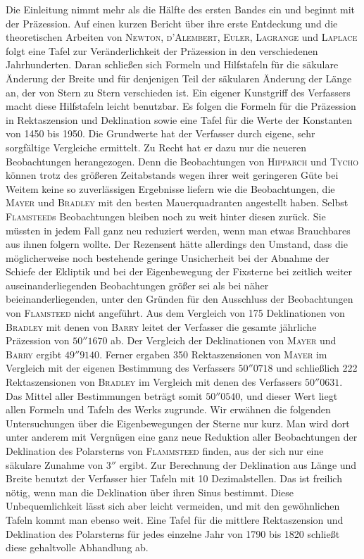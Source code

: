 Die Einleitung nimmt mehr als die Hälfte des ersten Bandes ein und beginnt mit der Präzession. Auf einen kurzen Bericht über ihre erste Entdeckung und die theoretischen Arbeiten von \textsc{Newton}, \textsc{d’Alembert}, \textsc{Euler}, \textsc{Lagrange} und \textsc{Laplace} folgt eine Tafel zur Veränderlichkeit der Präzession in den verschiedenen Jahrhunderten. Daran schließen sich Formeln und Hilfstafeln für die säkulare Änderung der Breite und für denjenigen Teil der säkularen Änderung der Länge an, der von Stern zu Stern verschieden ist. Ein eigener Kunstgriff des Verfassers macht diese Hilfstafeln leicht benutzbar. Es folgen die Formeln für die Präzession in Rektaszension und Deklination sowie eine Tafel für die Werte der Konstanten von 1450 bis 1950. Die Grundwerte hat der Verfasser durch eigene, sehr sorgfältige Vergleiche ermittelt. Zu Recht hat er dazu nur die neueren Beobachtungen herangezogen. Denn die Beobachtungen von \textsc{Hipparch} und \textsc{Tycho} können trotz des größeren Zeitabstands wegen ihrer weit geringeren Güte bei Weitem keine so zuverlässigen Ergebnisse liefern wie die Beobachtungen, die \textsc{Mayer} und \textsc{Bradley} mit den besten Mauerquadranten angestellt haben. Selbst \textsc{Flamsteed}s Beobachtungen bleiben noch zu weit hinter diesen zurück. Sie müssten in jedem Fall ganz neu reduziert werden, wenn man etwas Brauchbares aus ihnen folgern wollte. Der Rezensent hätte allerdings den Umstand, dass die möglicherweise noch bestehende geringe Unsicherheit bei der Abnahme der Schiefe der Ekliptik und bei der Eigenbewegung der Fixsterne bei zeitlich weiter auseinanderliegenden Beobachtungen größer sei als bei näher beieinanderliegenden, unter den Gründen für den Ausschluss der Beobachtungen von \textsc{Flamsteed} nicht angeführt. Aus dem Vergleich von 175 Deklinationen von \textsc{Bradley} mit denen von \textsc{Barry} leitet der Verfasser die gesamte jährliche Präzession von $50''1670$ ab. Der Vergleich der Deklinationen von \textsc{Mayer} und \textsc{Barry} ergibt $49''9140$. Ferner ergaben 350 Rektaszensionen von \textsc{Mayer} im Vergleich mit der eigenen Bestimmung des Verfassers $50''0718$ und schließlich 222 Rektaszensionen von \textsc{Bradley} im Vergleich mit denen des Verfassers $50''0631$. Das Mittel aller Bestimmungen beträgt somit $50''0540$, und dieser Wert liegt allen Formeln und Tafeln des Werks zugrunde. Wir erwähnen die folgenden Untersuchungen über die Eigenbewegungen der Sterne nur kurz. Man wird dort unter anderem mit Vergnügen eine ganz neue Reduktion aller Beobachtungen der Deklination des Polarsterns von \textsc{Flammsteed} finden, aus der sich nur eine säkulare Zunahme von $3''$ ergibt. Zur Berechnung der Deklination aus Länge und Breite benutzt der Verfasser hier Tafeln mit 10 Dezimalstellen. Das ist freilich nötig, wenn man die Deklination über ihren Sinus bestimmt. Diese Unbequemlichkeit lässt sich aber leicht vermeiden, und mit den gewöhnlichen Tafeln kommt man ebenso weit. Eine Tafel für die mittlere Rektaszension und Deklination des Polarsterns für jedes einzelne Jahr von 1790 bis 1820 schließt diese gehaltvolle Abhandlung ab.

